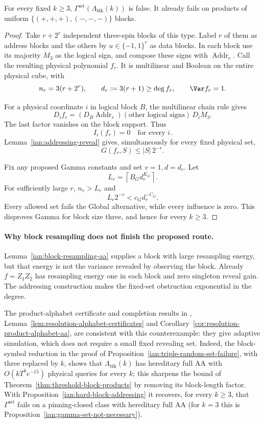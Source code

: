 \begin{proposition}
\label{ian:hard-block-addressing}
For every fixed \(k\ge3\),
\(\Gamma^{\mathrm{set}}(\Lambda_{\mathrm{blk}}(k))\) is false.
It already fails on products of uniform
\(\{(+,+,+),(-,-,-)\}\) blocks.
\end{proposition}

\begin{proof}
Take \(r+2^r\) independent three-spin blocks of this type. Label
\(r\) of them as address blocks and the others by
\(u\in\{-1,1\}^r\) as data blocks. In each block use its majority
\(M_3\) as the logical sign, and compose these signs with
\(\operatorname{Addr}_r\). Call the resulting physical polynomial
\(f_r\). It is multilinear and Boolean on the entire physical cube,
with
\[
 n_r=3(r+2^r),\qquad
 d_r:=3(r+1)\ge\deg f_r,\qquad
 \Var f_r=1.
\]

For a physical coordinate \(i\) in logical block \(B\), the
multilinear chain rule gives
\[
 D_if_r
 =(D_B\operatorname{Addr}_r)(\text{other logical signs})\,D_iM_3.
\]
The last factor vanishes on the block support. Thus
\[
 I_i(f_r)=0\quad\text{for every }i.
\]
Lemma~\ref{ian:addressing-reveal} gives, simultaneously for every
fixed physical set,
\[
 G(f_r,S)\le |S|\,2^{-r}.
\]

Fix any proposed Gamma constants and set \(v=1,d=d_r\). Let
\[
 L_r=\left\lceil B_Gd_r^{K_G}\right\rceil.
\]
For sufficiently large \(r\), \(n_r>L_r\) and
\[
 L_r2^{-r}<c_Gd_r^{-C_G}.
\]
Every allowed set fails the Global alternative, while every influence
is zero. This disproves Gamma for block size three, and hence for
every \(k\ge3\).
\end{proof}

\paragraph{Why block resampling does not finish the proposed route.}
Lemma~\ref{ian:block-resampling-aa} supplies a block with large
resampling energy, but that energy is not the variance revealed by
observing the block. Already \(f=Z_1Z_2\) has resampling energy one
in each block and zero singleton reveal gain.
The addressing construction makes the fixed-set obstruction
exponential in the degree.

The product-alphabet certificate and completion results in
,
Lemma~\ref{lem:resolution-alphabet-certificates} and
Corollary~\ref{cor:resolution-product-alphabet-aa}, are consistent
with this counterexample: they give adaptive simulation, which does
not require a small fixed revealing set. Indeed, the block-symbol
reduction in the proof of
Proposition~\ref{ian:triple-random-set-failure}, with three replaced
by \(k\), shows that \(\Lambda_{\mathrm{blk}}(k)\) has hereditary full
AA with \(O(kT^6e^{-15})\) physical queries for every \(k\); this
sharpens the bound of Theorem~\ref{thm:threshold-block-products} by
removing its block-length factor. With
Proposition~\ref{ian:hard-block-addressing} it recovers, for every
\(k\ge3\), that \(\Gamma^{\mathrm{set}}\) fails on a pinning-closed class
with hereditary full AA (for \(k=3\) this is
Proposition~\ref{ian:gamma-set-not-necessary}).

